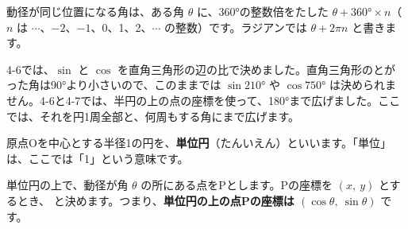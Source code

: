 \begin{seikaku}
動径が同じ位置になる角は、ある角 $\theta$ に、360°の整数倍をたした $\theta+360°\times n$（$n$ は $\cdots$、$-2$、$-1$、0、1、2、$\cdots$ の整数）です。ラジアンでは $\theta+2\pi n$ と書きます。
\end{seikaku}


\leavevmode\label{bk:4-8:tanien}4-6では、$\sin$ と $\cos$ を直角三角形の辺の比で決めました。直角三角形のとがった角は90°より小さいので、このままでは $\sin210°$ や $\cos750°$ は決められません。4-6と4-7では、半円の上の点の座標を使って、180°まで広げました。ここでは、それを円1周全部と、何周もする角にまで広げます。

原点Oを中心とする半径1の円を、\textbf{単位円}（たんいえん）といいます。「単位」は、ここでは「1」という意味です。

単位円の上で、動径が角 $\theta$ の所にある点をPとします。Pの座標を $(x,\ y)$ とするとき、
と決めます。つまり、\textbf{単位円の上の点Pの座標は $(\cos\theta,\ \sin\theta)$} です。

